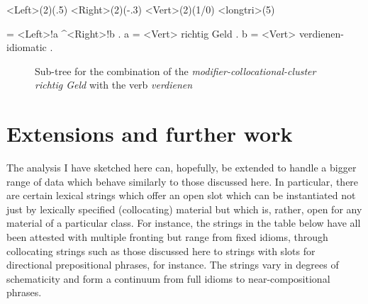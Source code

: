 \documentclass[11pt,a4paper,fleqn]{article}
\begin{document}
\newsavebox{\VerbpicksupclusterTree}
\sbox{\VerbpicksupclusterTree}
{
  \jtree
    <Left>(2)(.5)
    <Right>(2)(-.3)
    <Vert>(2)(1/0)
    <longtri>(5)

    \! = {\AvmSeven}<Left>!a ^<Right>!b .
    \!a = {\AvmSix}<Vert> {richtig Geld} .
    \!b = {\AvmEight}<Vert> {verdienen-idiomatic} .
  \endjtree
}
\begin{figure}[htbp]
\caption{\label{fig-richtig-geld-verdienen}Sub-tree for the combination of the \textit{modifier-collocational-cluster} \textit{richtig Geld} with the verb \textit{verdienen}}
\end{figure}



\section{Extensions and further work}

The analysis I have sketched here can, hopefully, be extended to handle a bigger range of data which
behave similarly to those discussed here. In particular, there are certain lexical strings which offer an open slot 
which can be instantiated not just by lexically specified (collocating) material but which is, rather, open for any material of a particular class. For instance,
the strings in the table below have all been attested with multiple fronting but range from fixed idioms, through collocating
strings such as those discussed here to strings with slots for directional prepositional phrases, for instance. The strings
 vary in degrees of schematicity and form a continuum from full idioms to  near-compositional phrases.
  
\end{document}
